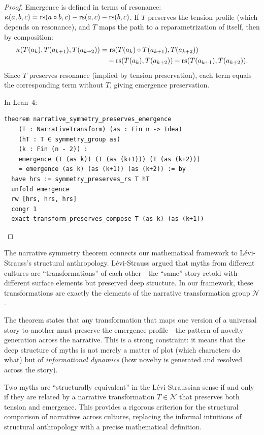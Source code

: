 \begin{proof}
Emergence is defined in terms of resonance:
$\kappa(a,b,c) = \mathrm{rs}(a \circ b, c) - \mathrm{rs}(a, c) - \mathrm{rs}(b, c)$.
If $T$ preserves the tension profile (which depends on resonance), and
$T$ maps the path to a reparametrization of itself, then by composition:
\begin{align}
  \kappa(T(a_k), T(a_{k+1}), T(a_{k+2}))
  &= \mathrm{rs}(T(a_k) \circ T(a_{k+1}), T(a_{k+2})) \\
  &\quad - \mathrm{rs}(T(a_k), T(a_{k+2})) - \mathrm{rs}(T(a_{k+1}), T(a_{k+2})).
\end{align}
Since $T$ preserves resonance (implied by tension preservation), each term
equals the corresponding term without $T$, giving emergence preservation.

In Lean~4:
\begin{lstlisting}
theorem narrative_symmetry_preserves_emergence
    (T : NarrativeTransform) (as : Fin n -> Idea)
    (hT : T ∈ symmetry_group as)
    (k : Fin (n - 2)) :
    emergence (T (as k)) (T (as (k+1))) (T (as (k+2)))
    = emergence (as k) (as (k+1)) (as (k+2)) := by
  have hrs := symmetry_preserves_rs T hT
  unfold emergence
  rw [hrs, hrs, hrs]
  congr 1
  exact transform_preserves_compose T (as k) (as (k+1))
\end{lstlisting}
\end{proof}

\begin{interpretation}
\label{interp:narrative-symmetry}
The narrative symmetry theorem connects our mathematical framework to
L\'evi-Strauss's structural anthropology.  L\'evi-Strauss argued that
myths from different cultures are ``transformations'' of each other---the
``same'' story retold with different surface elements but preserved deep
structure.  In our framework, these transformations are exactly the elements
of the narrative transformation group $\mathcal{N}$.

The theorem states that any transformation that maps one version of a universal
story to another must preserve the emergence profile---the pattern of novelty
generation across the narrative.  This is a strong constraint: it means that
the deep structure of myths is not merely a matter of plot (which characters
do what) but of \emph{informational dynamics} (how novelty is generated and
resolved across the story).

Two myths are ``structurally equivalent'' in the L\'evi-Straussian sense if
and only if they are related by a narrative transformation $T \in \mathcal{N}$
that preserves both tension and emergence.  This provides a rigorous criterion
for the structural comparison of narratives across cultures, replacing the
informal intuitions of structural anthropology with a precise mathematical
definition.
\end{interpretation}

